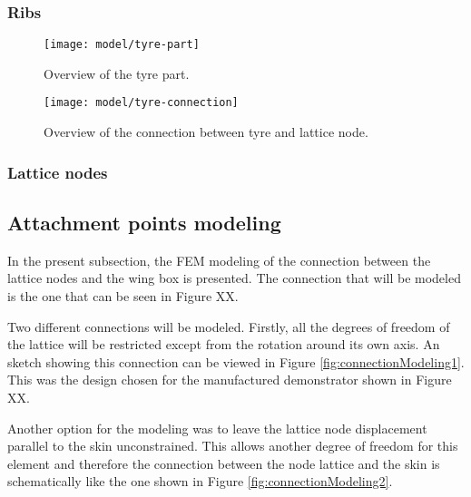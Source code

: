 \subsubsection{Ribs} \label{subsubsec:Ribs_Parametrization}

\begin{figure}[!htpb]
  \centering
  \texttt{[image: model/tyre-part]}
  \caption[Overview of the tyre part]{Overview of the tyre part.}\label{fig:tyre-part}
\end{figure}

\begin{figure}[!htpb]
  \centering
  \texttt{[image: model/tyre-connection]}
  \caption[Overview of the connection between tyre and lattice node]{Overview of the connection between tyre and lattice node.}\label{fig:tyre-connection}
\end{figure}

\subsubsection{Lattice nodes} \label{subsubsec:LatticeNodes_Parametrization}

\subsection{Attachment points modeling} \label{subsec:connections_computationalModel}

%
%
% 
%
In the present subsection, the FEM modeling of the connection between the lattice nodes and the wing box is presented. The connection that will be modeled is the one that can be seen in Figure XX.


Two different connections will be modeled. Firstly, all the degrees of freedom of the lattice will be restricted except from the rotation around its own axis. An sketch showing this connection can be viewed in Figure \ref{fig:connectionModeling1}. This was the design chosen for the manufactured demonstrator shown in Figure XX.

Another option for the modeling was to leave the lattice node displacement parallel to the skin unconstrained. This allows another degree of freedom for this element and therefore the connection between the node lattice and the skin is schematically like the one shown in Figure \ref{fig:connectionModeling2}.


